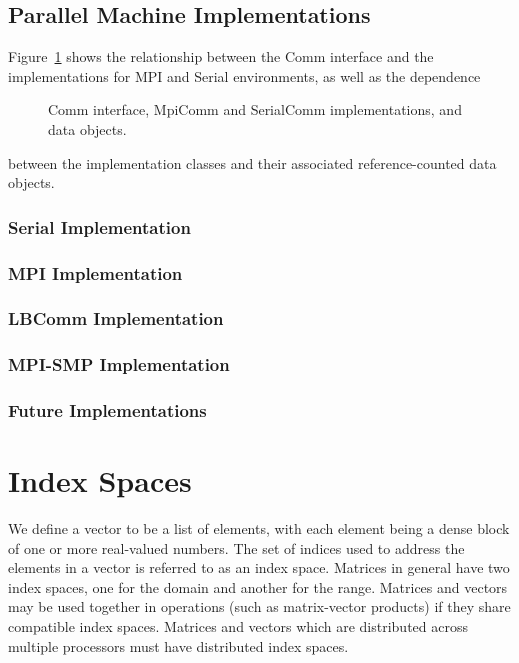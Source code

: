 \documentclass[10pt,relax]{PetraObjectModel}
\begin{document}
\subsection{Parallel Machine Implementations}
Figure~\ref{commfigure} shows the relationship between the Comm interface and
the implementations for MPI and Serial environments, as well as the dependence
\begin{figure}[ht]
\begin{center}
\caption{Comm interface, MpiComm and SerialComm implementations, and data objects.}
\label{commfigure}
\end{center}
\end{figure}
between the implementation classes and their associated reference-counted
data objects.

\subsubsection{Serial Implementation}
\subsubsection{MPI Implementation}
\subsubsection{LBComm Implementation}
\subsubsection{MPI-SMP Implementation}
\subsubsection{Future Implementations}


\section{Index Spaces}
We define a vector to be a list of elements, with each element being a
dense block of one or more real-valued numbers. The set of indices used to
address the elements in a vector is referred to as an index space. Matrices
in general have two index spaces, one for the domain and another for the
range. Matrices and vectors may be used together in operations (such as
matrix-vector products) if they share compatible index spaces. Matrices
and vectors which are distributed across multiple processors must have
distributed index spaces.
\end{document}
